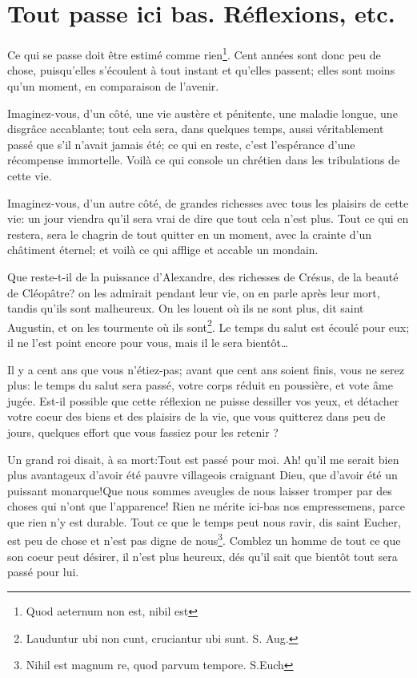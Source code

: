 \documentclass[instructions.tex]{subfiles}
\begin{document}
 
\chapter{Tout passe ici bas. Réflexions, etc.}
 

\primo Ce qui se passe doit être estimé comme rien\footnote{Quod aeternum non est, nibil est}. Cent années sont donc peu de chose, puisqu'elles s'écoulent à tout instant et qu'elles passent; elles sont moins qu'un moment, en comparaison de l'avenir. 

Imaginez-vous, d'un côté, une vie austère et pénitente, une maladie longue, une disgrâce accablante; tout cela sera, dans quelques temps, aussi véritablement passé que s'il n'avait jamais été; ce qui en reste, c'est l'espérance d'une récompense immortelle. Voilà ce qui console un chrétien dans les tribulations de cette vie. 

Imaginez-vous, d'un autre côté, de grandes richesses avec tous les plaisirs de cette vie: un jour viendra qu'il sera vrai de dire que tout cela n'est plus. Tout ce qui en restera, sera le chagrin de tout quitter en un moment, avec la crainte d'un châtiment éternel; et voilà ce qui afflige et accable un mondain. 

Que reste-t-il de la puissance d'Alexandre, des richesses de Crésus, de la beauté de Cléopâtre? on les admirait pendant leur vie, on en parle après leur mort, tandis qu'ils sont malheureux. On les louent où ils ne sont plus, dit saint Augustin, et on les tourmente où ils sont\footnote{Lauduntur ubi non cunt, cruciantur ubi sunt. S. Aug.}. Le temps du salut est écoulé pour eux; il ne l'est point encore pour vous, mais il le sera bientôt\dots

Il y a cent ans que vous n'étiez-pas; avant que cent ans soient finis, vous ne serez plus: le temps du salut sera passé, votre corps réduit en poussière, et vote âme jugée. Est-il possible que cette réflexion ne puisse dessiller vos yeux, et détacher votre coeur des biens et des plaisirs de la vie, que vous quitterez dans peu de jours, quelques effort que vous fassiez pour les retenir ?

Un grand roi disait, à sa mort:\og Tout est passé pour moi. Ah! qu'il me serait bien plus avantageux d'avoir été pauvre villageois craignant Dieu, que d'avoir été un puissant monarque!\fg Que nous sommes aveugles de nous laisser tromper par des choses qui n'ont que l'apparence! Rien ne mérite ici-bas nos empressemens, parce que rien n'y est durable. Tout ce que le temps peut nous ravir, dis saint Eucher, est peu de chose et n'est pas digne de nous\footnote{Nihil est magnum re, quod parvum tempore. S.Euch}. Comblez un homme de tout ce que son coeur peut désirer, il n'est plus heureux, dés qu'il sait que bientôt tout sera passé pour lui. 
\end{document}
